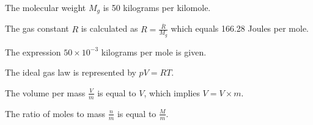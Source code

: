 The molecular weight \( M_g \) is 50 kilograms per kilomole.

The gas constant \( R \) is calculated as \( R = \frac{\overline{R}}{M_g} \) which equals 166.28 Joules per mole.

The expression \( 50 \times 10^{-3} \) kilograms per mole is given.

The ideal gas law is represented by \( pV = RT \).

The volume per mass \( \frac{V}{m} \) is equal to \( V \), which implies \( V = V \times m \).

The ratio of moles to mass \( \frac{n}{m} \) is equal to \( \frac{M}{m} \).